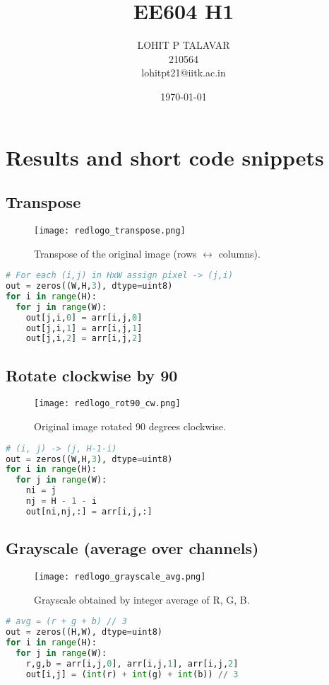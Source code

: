 \documentclass[11pt,a4paper]{article}
\title{EE604 H1}
\author{LOHIT P TALAVAR \\ 210564 \\ lohitpt21@iitk.ac.in}
\date{\today}
\begin{document}
\maketitle
\tableofcontents
\clearpage


\section{Results and short code snippets}

\subsection{Transpose}
\begin{figure}[H]
  \centering
  \texttt{[image: redlogo\_transpose.png]}
  \caption{Transpose of the original image (rows $\leftrightarrow$ columns).}
\end{figure}
\begin{lstlisting}[language=Python, caption=Manual transpose snippet]
# For each (i,j) in HxW assign pixel -> (j,i)
out = zeros((W,H,3), dtype=uint8)
for i in range(H):
  for j in range(W):
    out[j,i,0] = arr[i,j,0]
    out[j,i,1] = arr[i,j,1]
    out[j,i,2] = arr[i,j,2]
\end{lstlisting}

\clearpage
\subsection{Rotate clockwise by 90\textdegree}
\begin{figure}[H]
  \centering
  \texttt{[image: redlogo\_rot90\_cw.png]}
  \caption{Original image rotated 90 degrees clockwise.}
\end{figure}
\begin{lstlisting}[language=Python, caption=Manual 90° CW rotation snippet]
# (i, j) -> (j, H-1-i)
out = zeros((W,H,3), dtype=uint8)
for i in range(H):
  for j in range(W):
    ni = j
    nj = H - 1 - i
    out[ni,nj,:] = arr[i,j,:]
\end{lstlisting}

\clearpage
\subsection{Grayscale (average over channels)}
\begin{figure}[H]
  \centering
  \texttt{[image: redlogo\_grayscale\_avg.png]}
  \caption{Grayscale obtained by integer average of R, G, B.}
\end{figure}
\begin{lstlisting}[language=Python, caption=Manual average grayscale snippet]
# avg = (r + g + b) // 3
out = zeros((H,W), dtype=uint8)
for i in range(H):
  for j in range(W):
    r,g,b = arr[i,j,0], arr[i,j,1], arr[i,j,2]
    out[i,j] = (int(r) + int(g) + int(b)) // 3
\end{lstlisting}
\end{document}
